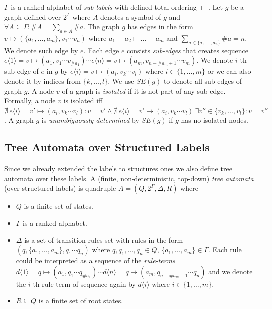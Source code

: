 $\Gamma$ is a ranked alphabet of \emph{sub-labels} with defined total ordering $\sqsubset$.
Let $g$ be a graph defined over $2^\Gamma$ where $A$ denotes a symbol of $g$ and $\forall A \subseteq \Gamma: \#A = \sum_{a\in A} \#a$.
The graph $g$ has edges in the form $v \mapsto (\{a_1,\ldots,a_m\},v_1 \cdots v_n)$ where
$a_1 \sqsubset a_2 \sqsubset \ldots \sqsubset a_m$ and $\sum_{a \in \{a_1,\ldots,a_n\}} \# a = n$.
We denote such edge by $e$.
Each edge $e$ consists \emph{sub-edges} that creates sequence $e\langle 1\rangle = v \mapsto (a_1,v_1 \cdots v_{\#a_1}) \cdots e\langle n\rangle= v \mapsto (a_m,v_{n-\#a_m+1} \cdots v_m)$.
We denote $i$-th sub-edge of $e$ in $g$ by $e\langle i\rangle = v \mapsto (a_i,v_k \cdots v_l)$ where $i \in \{1,\ldots,m\}$ or
we can also denote it by indices from $\{k,\ldots,l\}$.
We use $SE(g)$ to denote all sub-edges of graph $g$.
A node $v$ of a graph is \emph{isolated} if it is not part of any sub-edge.
Formally, a node $v$ is isolated iff $\nexists\, e\langle i\rangle = v' \mapsto (a_i,v_k \cdots v_l): v = v' \wedge \nexists\, e\langle i\rangle = v' \mapsto (a_i,v_k \cdots v_l)\ \exists v'' \in \{v_k,\ldots, v_l\}: v = v''$.
A graph $g$ is \emph{unambiguously determined} by $SE(g)$ if $g$ has no isolated nodes.

\subsection{Tree Automata over Structured Labels}

Since we already extended the labels to structures ones we also define tree automata over these labels.
A (finite, non-deterministic, top-down) \emph{tree automata} (over structured labels) is quadruple $A=(Q,2^\Gamma, \Delta, R)$ where
\begin{itemize}
	\item $Q$ is a finite set of states.
	\item $\Gamma$ is a ranked alphabet.
	\item $\Delta$ is a set of transition rules set with rules in the form $(q,\{a_1,\ldots,a_m\},q_1 \cdots q_n)$ where $q,q_1,\ldots,q_n \in Q$, $\{a_1,\ldots,a_m\} \in \Gamma$.
	Each rule could be interpreted as a sequence of the \emph{rule-terms} $d\langle 1\rangle = q \mapsto (a_1,q_1 \cdots q_{\#a_1}) \cdots d\langle n\rangle= q \mapsto (a_m,q_{n-\#a_m+1} \cdots q_n)$ and
	we denote the $i$-th rule term of sequence again by $d\langle i\rangle$ where $i \in \{1,\ldots,m\}$.
	\item $R\subseteq Q$ is a finite set of root states.
\end{itemize}

